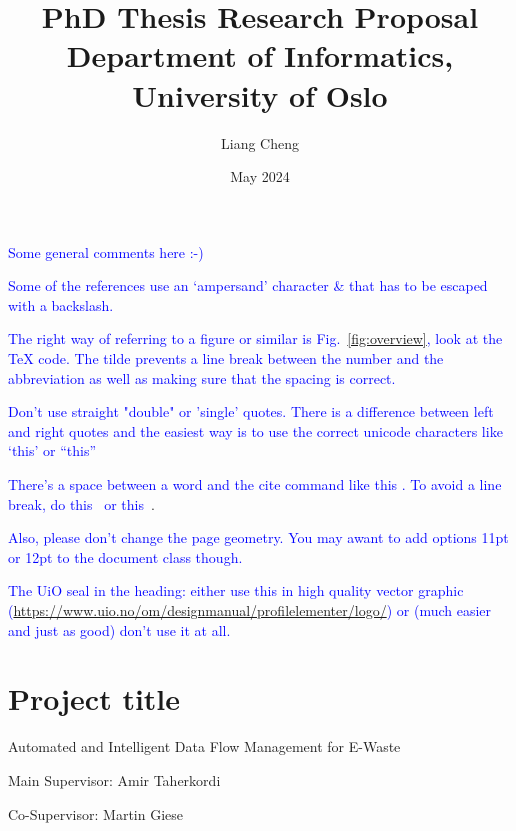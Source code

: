 \documentclass{article}
\title{PhD Thesis Research Proposal \\ Department of Informatics, University of Oslo}
\author{Liang Cheng}
\date{May 2024}
\newcommand{\MGcomment}[1]{\textcolor{blue}{#1}}
\numberwithin{equation}{section}
\begin{document}
\maketitle

\MGcomment{Some general comments here :-)}

\MGcomment{Some of the references use an ‘ampersand’ character \& that has to be escaped with a backslash.}

\MGcomment{The right way of referring to a figure or similar is Fig.~\ref{fig:overview}, look at the TeX code.  The tilde prevents a line break between the number and the abbreviation as well as making sure that the spacing is correct.}

\MGcomment{Don’t use straight "double" or 'single' quotes.  There is a difference between left and right quotes and the easiest way is to use the correct unicode characters like ‘this’ or “this”}

\MGcomment{There’s a space between a word and the cite command like this \cite{Forti20}. To avoid a line break, do this~\cite{Forti20} or this\ \cite{Forti20}}.

\MGcomment{Also, please don’t change the page geometry.  You may awant to add options 11pt or 12pt to the document class though.}

\MGcomment{The UiO seal in the heading: either use this in high quality vector graphic (\url{https://www.uio.no/om/designmanual/profilelementer/logo/}) or (much easier and just as good) don’t use it at all.}

\section{Project title}
Automated and Intelligent Data Flow Management for E-Waste 

Main Supervisor: Amir Taherkordi 

Co-Supervisor: Martin Giese
\end{document}
